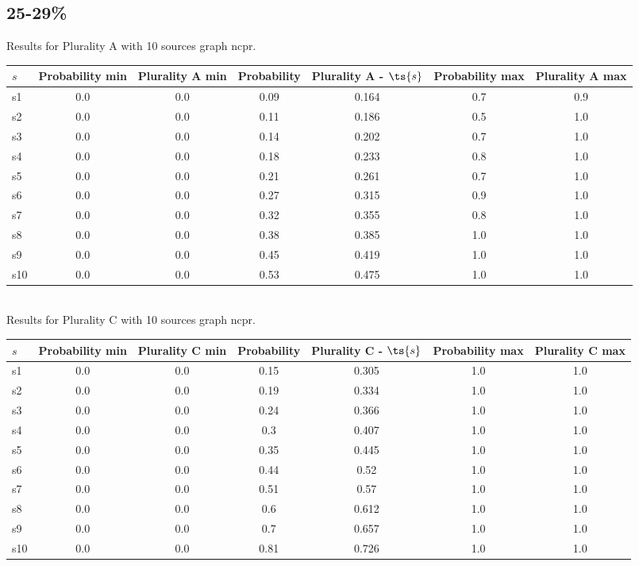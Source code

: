 \documentclass{article}
\begin{document}
\newpage

\subsection{25-29\%}

\noindent Results for Plurality A with 10 sources graph ncpr.

\noindent\begin{tabular}{|l|c|c|c|c|c|c|}
\hline
$s$& Probability min & Plurality A min & Probability & Plurality A - $\ts{s}$ & Probability max & Plurality A max\\
\hline
s1 &0.0 & 0.0 & 0.09 & 0.164 & 0.7 & 0.9\\
\hline
s2 &0.0 & 0.0 & 0.11 & 0.186 & 0.5 & 1.0\\
\hline
s3 &0.0 & 0.0 & 0.14 & 0.202 & 0.7 & 1.0\\
\hline
s4 &0.0 & 0.0 & 0.18 & 0.233 & 0.8 & 1.0\\
\hline
s5 &0.0 & 0.0 & 0.21 & 0.261 & 0.7 & 1.0\\
\hline
s6 &0.0 & 0.0 & 0.27 & 0.315 & 0.9 & 1.0\\
\hline
s7 &0.0 & 0.0 & 0.32 & 0.355 & 0.8 & 1.0\\
\hline
s8 &0.0 & 0.0 & 0.38 & 0.385 & 1.0 & 1.0\\
\hline
s9 &0.0 & 0.0 & 0.45 & 0.419 & 1.0 & 1.0\\
\hline
s10 &0.0 & 0.0 & 0.53 & 0.475 & 1.0 & 1.0\\
\hline
\end{tabular}\\

\noindent Results for Plurality C with 10 sources graph ncpr.

\noindent\begin{tabular}{|l|c|c|c|c|c|c|}
\hline
$s$& Probability min & Plurality C min & Probability & Plurality C - $\ts{s}$ & Probability max & Plurality C max\\
\hline
s1 &0.0 & 0.0 & 0.15 & 0.305 & 1.0 & 1.0\\
\hline
s2 &0.0 & 0.0 & 0.19 & 0.334 & 1.0 & 1.0\\
\hline
s3 &0.0 & 0.0 & 0.24 & 0.366 & 1.0 & 1.0\\
\hline
s4 &0.0 & 0.0 & 0.3 & 0.407 & 1.0 & 1.0\\
\hline
s5 &0.0 & 0.0 & 0.35 & 0.445 & 1.0 & 1.0\\
\hline
s6 &0.0 & 0.0 & 0.44 & 0.52 & 1.0 & 1.0\\
\hline
s7 &0.0 & 0.0 & 0.51 & 0.57 & 1.0 & 1.0\\
\hline
s8 &0.0 & 0.0 & 0.6 & 0.612 & 1.0 & 1.0\\
\hline
s9 &0.0 & 0.0 & 0.7 & 0.657 & 1.0 & 1.0\\
\hline
s10 &0.0 & 0.0 & 0.81 & 0.726 & 1.0 & 1.0\\
\hline
\end{tabular}\\
\end{document}
